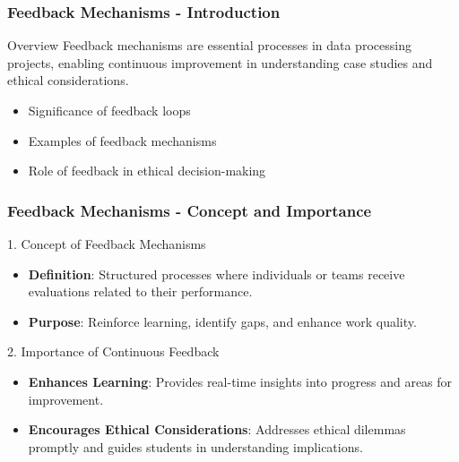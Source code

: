 \documentclass[aspectratio=169]{beamer}
\begin{document}
\begin{frame}[fragile]
    \frametitle{Feedback Mechanisms - Introduction}
    \begin{block}{Overview}
        Feedback mechanisms are essential processes in data processing projects, enabling continuous improvement in understanding case studies and ethical considerations.
    \end{block}
    \begin{itemize}
        \item Significance of feedback loops
        \item Examples of feedback mechanisms
        \item Role of feedback in ethical decision-making
    \end{itemize}
\end{frame}

\begin{frame}[fragile]
    \frametitle{Feedback Mechanisms - Concept and Importance}
    \begin{block}{1. Concept of Feedback Mechanisms}
        \begin{itemize}
            \item \textbf{Definition}: Structured processes where individuals or teams receive evaluations related to their performance.
            \item \textbf{Purpose}: Reinforce learning, identify gaps, and enhance work quality.
        \end{itemize}
    \end{block}

    \begin{block}{2. Importance of Continuous Feedback}
        \begin{itemize}
            \item \textbf{Enhances Learning}: Provides real-time insights into progress and areas for improvement.
            \item \textbf{Encourages Ethical Considerations}: Addresses ethical dilemmas promptly and guides students in understanding implications.
        \end{itemize}
    \end{block}
\end{frame}
\end{document}
